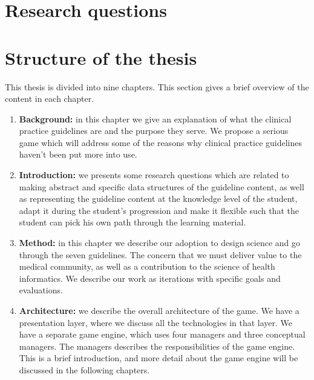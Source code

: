 

\section{Research questions}

\section{Structure of the thesis}
This thesis is divided into nine chapters. This section gives a brief overview of the content in each chapter.
\begin{enumerate}
	\item \textbf{Background:} in this chapter we give an explanation of what the clinical practice guidelines are and the purpose they serve. We propose a serious game which will address some of the reasons why clinical practice guidelines haven't been put more into use.
	
	\item \textbf{Introduction:} we presents some research questions which are related to making abstract and specific data structures of the guideline content, as well as representing the guideline content at the knowledge level of the student, adapt it during the student's progression and make it flexible such that the student can pick his own path through the learning material.
	
	\item \textbf{Method:} in this chapter we describe our adoption to design science and go through the seven guidelines. The concern that we must deliver value to the medical community, as well as a contribution to the science of health informatics. We describe our work as iterations with specific goals and evaluations.
	
	\item \textbf{Architecture:} we describe the overall architecture of the game. We have a presentation layer, where we discuss all the technologies in that layer. We have a separate game engine, which uses four managers and three conceptual managers. The managers describes the responsibilities of the game engine. This is a brief introduction, and more detail about the game engine will be discussed in the following chapters.


\end{enumerate}
